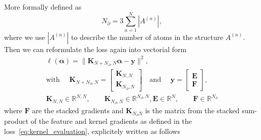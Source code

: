 More formally defined as 
\begin{equation}
  N_{\partial} = 3\sum_{n=1}^{N} |A^{(n)}|,
\end{equation}
where we use $|A^{(n)}|$ to describe the number of atoms in the structure $A^{(n)}$.
Then we can reformulate the loss again into vectorial form
\begin{subequations}
  \begin{gather}
    \ell(\boldsymbol{\alpha}) = \|\mathbf{K}_{N+N_{\partial},N}\boldsymbol{\alpha} - \mathbf{y}\|^2, \\
    \textrm{with }\quad \mathbf{K}_{N+N_{\partial},N} =
    \left[
      \begin{array}{c}
        \mathbf{K}_{N,N}\\ %
        \mathbf{K}_{N_{\partial},N}
      \end{array}
    \right]
    \quad\textrm{and }\quad \mathbf{y} = 
    \left[
      \begin{array}{c}
        \mathbf{E} \\
        \mathbf{F}%
      \end{array}
    \right],\\
    \mathbf{K}_{N,N}\in\mathbb{R}^{N,N},\qquad \mathbf{K}_{N_{\partial},N}\in\mathbb{R}^{N_{\partial},N},%
    \mathbf{E}\in\mathbb{R}^N,\qquad \mathbf{F}\in\mathbb{R}^{N_{\partial}}
  \end{gather}
\end{subequations}
where $\mathbf{F}$ are the stacked gradients and $\mathbf{K}_{N_{\partial}N}$ is the matrix from the stacked sum-product of the feature and kernel gradients as defined in the loss~\ref{eq:kernel_evaluation}, explicitely written as follows
%
%
